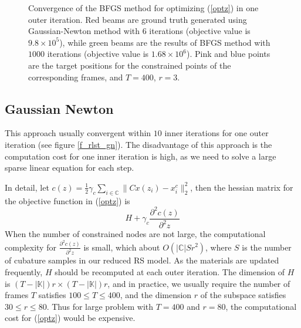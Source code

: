 \documentclass[9pt,twocolumn]{extarticle}
\begin{document}
\begin{figure}
  \centering
  \caption{Convergence of the BFGS method for optimizing (\ref{optz}) in one
    outer iteration. Red beams are ground truth generated using Gaussian-Newton
    method with 6 iterations (objective value is $9.8\times 10^5$), while green
    beams are the results of BFGS method with $1000$ iterations (objective value
    is $1.68\times 10^6$). Pink and blue points are the target positions for the
    constrained points of the corresponding frames, and $T=400$, $r=3$.}
  \label{f_rlst_bfgs}
\end{figure}

\subsection{Gaussian Newton}\label{sec:gaussian-newton}
This approach usually convergent within $10$ inner iterations for one outer
iteration (see figure \ref{f_rlst_gn}). The disadvantage of this approach is the
computation cost for one inner iteration is high, as we need to solve a large
sparse linear equation for each step.

In detail, let $c(z)=\frac{1}{2}\gamma_c\sum_{i\in
  \mathbb{C}}\|Cx(z_i)-{x}_i^c\|_{2}^2$, then the hessian matrix for the
objective function in (\ref{optz}) is
\begin{equation} \label{hessian}
  H+\gamma_c\frac{\partial^2{c(z)}}{\partial^2{z}}
\end{equation}
When the number of constrained nodes are not large, the computational complexity
for $\frac{\partial^2{c(z)}}{\partial^2{z}}$ is small, which about
$O(|\mathbb{C}|Sr^2)$, where $S$ is the number of cubature samples in our
reduced RS model. As the materials are updated frequently, $H$ should be
recomputed at each outer iteration. The dimension of $H$ is
$(T-|\mathbb{K}|)r\times (T-|\mathbb{K}|)r$, and in practice, we usually require
the number of frames $T$ satisfies $100\le T\le400$, and the dimension $r$ of
the subspace satisfies $30\le r\le80$. Thus for large problem with $T=400$ and
$r=80$, the computational cost for (\ref{optz}) would be expensive.
\end{document}

